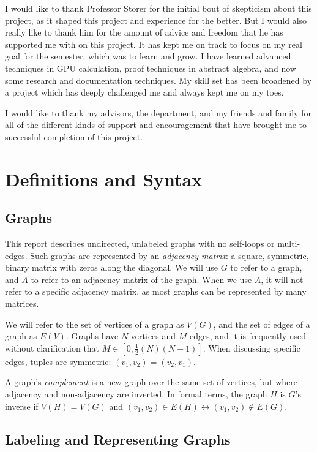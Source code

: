 \documentclass[11pt,a4paper]{report}
\begin{document}
I would like to thank Professor Storer for the initial bout of skepticism about this project, as it shaped this project and experience for the better.
But I would also really like to thank him for the amount of advice and freedom that he has supported me with on this project.
It has kept me on track to focus on my real goal for the semester, which was to learn and grow.
I have learned advanced techniques in GPU calculation, proof techniques in abstract algebra, and now some research and documentation techniques.
My skill set has been broadened by a project which has deeply challenged me and always kept me on my toes.

I would like to thank my advisors, the department, and my friends and family for all of the different kinds of support and encouragement that have brought me to successful completion of this project.

\chapter{Definitions and Syntax}


\section{Graphs}
This report describes undirected, unlabeled graphs with no self-loops or multi-edges.
Such graphs are represented by an \emph{adjacency matrix}: a square, symmetric, binary matrix with zeros along the diagonal.
We will use $G$ to refer to a graph, and $A$ to refer to an adjacency matrix of the graph.
When we use $A$, it will not refer to a specific adjacency matrix, as most graphs can be represented by many matrices.

We will refer to the set of vertices of a graph as $V(G)$, and the set of edges of a graph as $E(V)$.
Graphs have $N$ vertices and $M$ edges, and it is frequently used without clarification that $M \in [0, \frac{1}{2}(N)(N-1)]$.
When discussing specific edges, tuples are symmetric: $(v_1, v_2) = (v_2, v_1)$.

A graph's \emph{complement} is a new graph over the same set of vertices, but where adjacency and non-adjacency are inverted.
In formal terms, the graph $H$ is $G$'s inverse if $V(H) = V(G)$ and $(v_1, v_2) \in E(H) \leftrightarrow (v_1, v_2) \notin E(G)$.

\section{Labeling and Representing Graphs}
\end{document}
